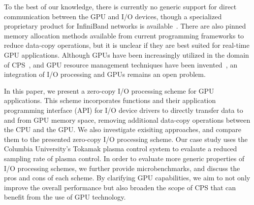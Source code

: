 To the best of our knowledge, there is currently no generic support for
direct communication between the GPU and I/O devices, though a
specialized proprietary product for InfiniBand networks is
available~\cite{GPUDirect}.
There are also pinned memory allocation methods available from current
programming frameworks to reduce data-copy operations, but it is unclear
if they are best suited for real-time GPU applications. 
Although GPUs have been increasingly utilized in the domain of
CPS~\cite{Hirabayashi_REACTION12, Mangharam11, McNaughton_ICRA11,
Michel_IROS07}, and GPU resource management techniques have been
invented~\cite{Elliott_RTS12, Elliott_ECRTS12, Kato_RTAS11, Kato_RTSS11,
Kato_ATC11, Kato_ATC12, Liu_PACT12}, an integration of I/O processing
and GPUs remains an open problem.

In this paper, we present a zero-copy I/O processing scheme for GPU
applications.
This scheme incorporates functions and their application programming
interface (API) for I/O device drivers to directly transfer data to and
from GPU memory space, removing additional data-copy operations between
the CPU and the GPU.
We also investigate exisiting approaches, and compare them to the
presented zero-copy I/O processing scheme.
Our case study uses the Columbia University's Tokamak plasma control
system to evalaute a reduced sampling rate of plasma control.
In order to evaluate more generic properties of I/O processing schemes,
we further provide microbenchmarks, and discuss the pros and cons of each
scheme.
By clarifying GPU capabilities, we aim to not only improve the overall
performance but also broaden the scope of CPS that can benefit from the
use of GPU technology.


